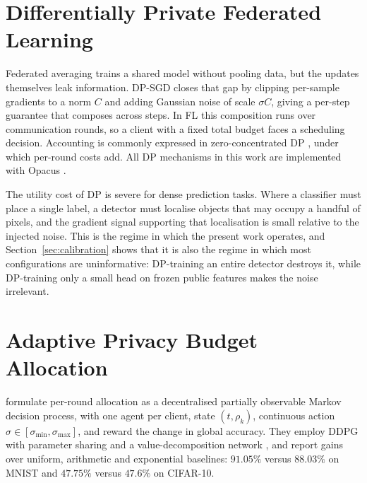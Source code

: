 \section{Differentially Private Federated Learning}

Federated averaging \cite{mcmahan2017communication} trains a shared model
without pooling data, but the updates themselves leak information. DP-SGD
\cite{abadi2016deep} closes that gap by clipping per-sample gradients to a norm
$C$ and adding Gaussian noise of scale $\sigma C$, giving a per-step guarantee
that composes across steps. In FL this composition runs over communication
rounds, so a client with a fixed total budget faces a scheduling decision.
Accounting is commonly expressed in zero-concentrated DP
\cite{bun2016concentrated}, under which per-round costs add. All DP mechanisms
in this work are implemented with Opacus \cite{opacus2021}.

\vspace{10pt}

The utility cost of DP is severe for dense prediction tasks. Where a classifier
must place a single label, a detector must localise objects that may occupy a
handful of pixels, and the gradient signal supporting that localisation is small
relative to the injected noise. This is the regime in which the present work
operates, and Section~\ref{sec:calibration} shows that it is also the regime in
which most configurations are uninformative: DP-training an entire detector
destroys it, while DP-training only a small head on frozen public features makes
the noise irrelevant.

\section{Adaptive Privacy Budget Allocation}

\citeauthor{ChenAdaptivePrivacyMARL} \cite{ChenAdaptivePrivacyMARL} formulate
per-round allocation as a decentralised partially observable Markov decision
process, with one agent per client, state $(t,\rho_k)$, continuous action
$\sigma\in[\sigma_{\min},\sigma_{\max}]$, and reward the change in global
accuracy. They employ DDPG \cite{lillicrap2016continuous} with parameter sharing
and a value-decomposition network \cite{sunehag2018value}, and report gains over
uniform, arithmetic and exponential baselines: $91.05\%$ versus $88.03\%$ on
MNIST and $47.75\%$ versus $47.6\%$ on CIFAR-10.

\vspace{10pt}


